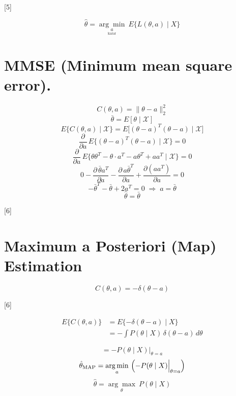 \documentclass[11pt,a4paper]{article}
\begin{document}
[5]

\[ \hat\theta = \underset{\underset{\text{karar}}{a}}{\arg\min}\ E\{L(\theta, a) \mid X\} \]

\section{MMSE (Minimum mean square error).}
\[ C(\theta,a) = \|\theta - a\|_2^2 \]
\[ \bar\theta = E[\theta \mid \mathcal{X}] \]
\[ E\{C(\theta,a) \mid \mathcal{X}\} = E\bigl[(\theta-a)^T(\theta-a) \mid \mathcal{X}\bigr] \]
\[ \frac{\partial}{\partial a}\, E\{(\theta-a)^T(\theta-a) \mid \mathcal{X}\} = 0 \]
\[ \frac{\partial}{\partial a}\, E\{\theta\theta^T - \theta \cdot a^T - a\theta^T + a a^T \mid \mathcal{X}\} = 0 \]
\[ 0 - \frac{\partial\, \bar\theta a^T}{\partial a} - \frac{\partial\, a\bar\theta^T}{\partial a} + \frac{\partial (a a^T)}{\partial a} = 0 \]
\[ -\bar\theta^T - \bar\theta + 2a^T = 0 \;\Rightarrow\; a = \bar\theta \]
\[ \hat\theta = \bar\theta \]

[6]

\section{Maximum a Posteriori (Map) Estimation}
\[ C(\theta,a) = -\delta(\theta - a) \]

[6]

\begin{align*}
E\{C(\theta,a)\} &= E\{-\delta(\theta-a) \mid X\} \\
&= -\int P(\theta \mid X)\,\delta(\theta-a)\, d\theta
\end{align*}

\[ {}= -P(\theta \mid X)\Big|_{\theta=a} \]
\[ \hat\theta_{\mathrm{MAP}} = \underset{a}{\arg\min}\ \Bigl(-P(\theta \mid X)\Big|_{\theta=a}\Bigr) \]
\[ \hat\theta = \underset{\theta}{\arg\max}\ P(\theta \mid X) \]
\end{document}

